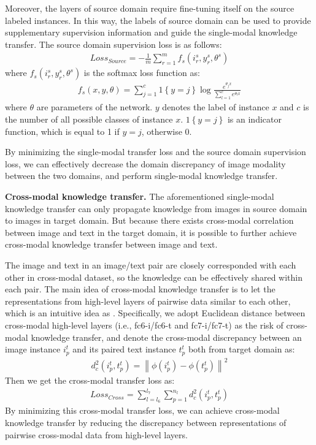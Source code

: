\documentclass{article}
\begin{document}
Moreover, the layers of source domain require fine-tuning itself on the source labeled instances. In this way, the labels of source domain can be used to provide supplementary supervision information and guide the single-modal knowledge transfer. The source domain supervision loss is as follows:
\begin{align}
Loss_{Source}=-\frac{1}{m}\sum_{r=1}^{m} f_s(i_r^s, y_r^s, \theta^s)
\end{align}
where $f_s(i_r^s, y_r^s, \theta^s)$ is the softmax loss function as:
\begin{align}
f_s(x, y, \theta) = \sum_{j=1}^c1\left \{ y=j \right \}\log \frac{e^{\theta_j x}}{\sum_{l=1}^c e^{\theta_l x}}
\end{align}
where $\theta$ are parameters of the network. $y$ denotes the label of instance $x$ and $c$ is the number of all possible classes of instance $x$. $1\left \{ y=j \right \}$ is an indicator function, which is equal to 1 if $y=j$, otherwise 0.

By minimizing the single-modal transfer loss and the source domain supervision loss, we can effectively decrease the domain discrepancy of image modality between the two domains, and perform single-modal knowledge transfer.


{\bf Cross-modal knowledge transfer.} 
The aforementioned single-modal knowledge transfer can only propagate knowledge from images in source domain to images in target domain. But because there exists cross-modal correlation between image and text in the target domain, it is possible to further achieve cross-modal knowledge transfer between image and text.

The image and text in an image/text pair are closely corresponded with each other in cross-modal dataset, so the knowledge can be effectively shared within each pair. 
The main idea of cross-modal knowledge transfer is to let the representations from high-level layers of pairwise data similar to each other, which is an intuitive idea as \cite{LiMM03CFA,feng12014cross}.
Specifically, we adopt Euclidean distance between cross-modal high-level layers (i.e., fc6-i/fc6-t and fc7-i/fc7-t) as the risk of cross-modal knowledge transfer, and denote the cross-modal discrepancy between an image instance $i_p^t$ and its paired text instance $t_p^t$ both from target domain as: 
\begin{align}
d_c^2(i_p^t,t_p^t)=\left \| \phi(i_p^t)-\phi(t_p^t) \right \|^2
\end{align} 
Then we get the cross-modal transfer loss as:
\begin{align}
Loss_{Cross}=\sum_{l=l_6}^{l_7}\sum_{p=1}^{n_l}d_c^2(i_p^t,t_p^t)
\end{align}
By minimizing this cross-modal transfer loss, we can achieve cross-modal knowledge transfer by reducing the discrepancy between representations of pairwise cross-modal data from high-level layers.
\end{document}
